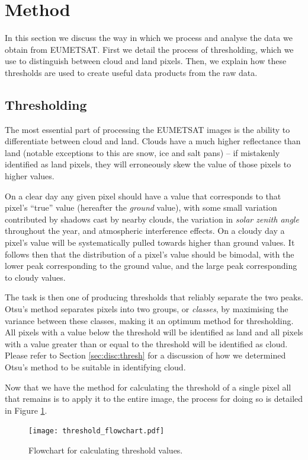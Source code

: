 \section{Method}
In this section we discuss the way in which we process and analyse the data we
obtain from EUMETSAT. First we detail the process of thresholding, which we use
to distinguish between cloud and land pixels. Then, we explain how these
thresholds are used to create useful data products from the raw data.

\subsection{Thresholding}
\label{sec:method:thr}
The most essential part of processing the EUMETSAT images is the ability to
differentiate between cloud and land. Clouds have a much higher reflectance than
land (notable exceptions to this are snow, ice and salt pans) -- if mistakenly
identified as land pixels, they will erroneously skew the value of those pixels
to higher values.

On a clear day any given pixel should have a value that corresponds to that
pixel's ``true'' value (hereafter the \emph{ground} value), with some small
variation contributed by shadows cast by nearby clouds, the variation in
\emph{solar zenith angle} throughout the year, and atmospheric interference
effects. On a cloudy day a pixel's value will be systematically pulled towards
higher than ground values. It follows then that the distribution of a pixel's
value should be bimodal, with the lower peak corresponding to the ground value,
and the large peak corresponding to cloudy values.

The task is then one of producing thresholds that reliably separate the two
peaks. Otsu's method \citep{gonzalez2008} separates pixels into two groups, or
\emph{classes}, by maximising the variance between these classes, making it an
optimum method for thresholding.  All pixels with a value below the threshold
will be identified as land and all pixels with a value greater than or equal to
the threshold will be identified as cloud. Please refer to Section
\ref{sec:disc:thresh} for a discussion of how we determined Otsu's method
to be suitable in identifying cloud.

Now that we have the method for calculating the threshold of a single
pixel all that remains is to apply it to the entire image, the process for doing
so is detailed in Figure \ref{fig:thr_fc}.
\begin{figure}[t!]
  \centering
  \texttt{[image: threshold\_flowchart.pdf]}
  \caption{Flowchart for calculating threshold values.}
  \label{fig:thr_fc}
\end{figure}

